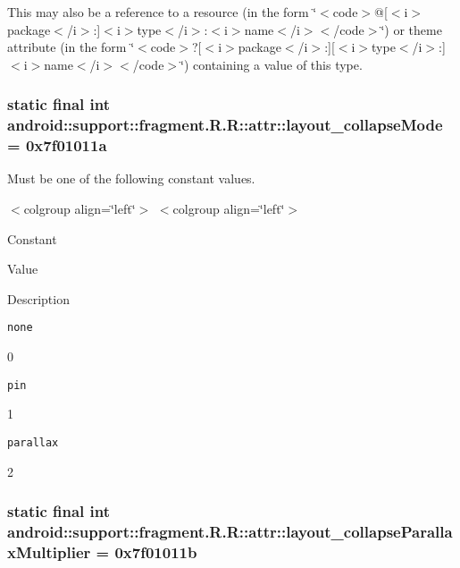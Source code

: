 This may also be a reference to a resource (in the form \char`\"{}$<$code$>$@\mbox{[}$<$i$>$package$<$/i$>$:\mbox{]}$<$i$>$type$<$/i$>$:$<$i$>$name$<$/i$>$$<$/code$>$\char`\"{}) or theme attribute (in the form \char`\"{}$<$code$>$?\mbox{[}$<$i$>$package$<$/i$>$:\mbox{]}\mbox{[}$<$i$>$type$<$/i$>$:\mbox{]}$<$i$>$name$<$/i$>$$<$/code$>$\char`\"{}) containing a value of this type. \hypertarget{classandroid_1_1support_1_1fragment_1_1_r_1_1attr_42071c580a97395a762b9bfc2824e5c5}{
\subsubsection[{layout\_\-collapseMode}]{\setlength{\rightskip}{0pt plus 5cm}static final int android::support::fragment.R.R::attr::layout\_\-collapseMode = 0x7f01011a}}
\label{classandroid_1_1support_1_1fragment_1_1_r_1_1attr_42071c580a97395a762b9bfc2824e5c5}


Must be one of the following constant values. \begin{TabularC}{0}
\hline
\end{TabularC}
$<$colgroup align=\char`\"{}left\char`\"{}$>$ $<$colgroup align=\char`\"{}left\char`\"{}$>$ 

Constant

Value

Description 

{\tt none}

0

{\tt pin}

1

{\tt parallax}

2\hypertarget{classandroid_1_1support_1_1fragment_1_1_r_1_1attr_dc936eb77ef75ed2751e2d652fbd9b97}{
\subsubsection[{layout\_\-collapseParallaxMultiplier}]{\setlength{\rightskip}{0pt plus 5cm}static final int android::support::fragment.R.R::attr::layout\_\-collapseParallaxMultiplier = 0x7f01011b}}
\label{classandroid_1_1support_1_1fragment_1_1_r_1_1attr_dc936eb77ef75ed2751e2d652fbd9b97}



